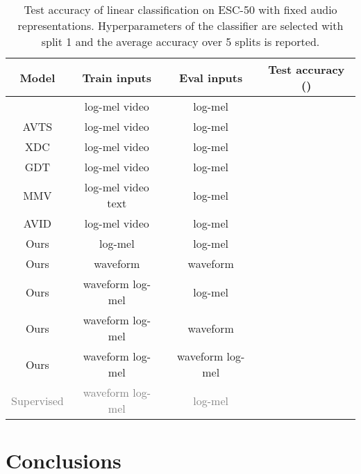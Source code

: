 \documentclass{article}
\newcommand\spv[1]{\textcolor{grey}{#1}}
\begin{document}
\begin{table}[t]
  \caption{Test accuracy of linear classification on ESC-50 with fixed audio representations. Hyperparameters of the classifier are selected with split 1 and the average accuracy over 5 splits is reported.}
  \label{tab:esc50_benckmark}
  \centering
  \begin{tabular}{ c c c c }
    \toprule
    \textbf{Model} & \textbf{Train inputs} & \textbf{Eval inputs} & \textbf{Test accuracy ()} \\
    \midrule
     \cite{arandjelovic2017look} & log-mel  video & log-mel & ~~~\\
    AVTS \cite{korbar2018cooperative} & log-mel  video & log-mel  & ~~~\\
    XDC \cite{alwassel2019self} & log-mel  video & log-mel & ~~~\\
    GDT \cite{mandela2020datatrans} & log-mel  video & log-mel & ~~~\\
    MMV \cite{alayrac2020self} & log-mel  video  text & log-mel  & ~~~\\
    AVID \cite{morgado20avid}  & log-mel  video & log-mel & ~~~\\
    \midrule
    Ours                  & log-mel     & log-mel     & ~~~\\
    Ours                  & waveform    & waveform      & ~~~\\
    Ours                  & waveform  log-mel & log-mel & ~~~\\
    Ours                  & waveform  log-mel & waveform & ~~~\\
    Ours                  & waveform  log-mel & waveform  log-mel & ~~~\\
    \midrule
    \spv{Supervised \cite{kong2020panns}}  &  \spv{waveform  log-mel} & \spv{log-mel}  & \spv{}~~~\\
    \bottomrule
  \end{tabular}
  
\end{table}



\section{Conclusions}
\end{document}
